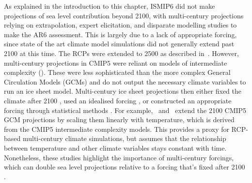 As explained in the introduction to this chapter, ISMIP6 did not make projections of sea level contribution beyond 2100, with multi-century projections relying on extrapolation, expert elicitation, and disparate modelling studies to make the AR6 assessment. This is largely due to a lack of appropriate forcing, since state of the art climate model simulations did not generally extend past 2100 at this time. The RCPs were extended to 2500 as described in~\cite{meinshausenRCPGreenhouseGas2011}. However, multi-century projections in CMIP5 were reliant on models of intermediate complexity (\citealt{zickfeldLongTermClimateChange2013}). These were less sophisticated than the more complex General Circulation Models (GCMs) and do not output the necessary climate variables to run an ice sheet model. Multi-century ice sheet projections then either fixed the climate after 2100 \citep{bindschadlerIcesheetModelSensitivities2013,lowryInfluenceEmissionsScenarios2021,lipscombISMIP6basedProjectionsOceanforced2021,chambersMassLossAntarctic2022}, used an idealised forcing \citep{martinMillennialScaleVulnerabilityAntarctic2019,garbeHysteresisAntarcticIce2020}, or constructed an appropriate forcing through statistical methods \citep{golledgeMultimillennialAntarcticCommitment2015,bulthuisUncertaintyQuantificationMulticentennial2019,decontoParisClimateAgreement2021,greveFutureProjectionsAntarctic2023}. For example,~\cite{golledgeMultimillennialAntarcticCommitment2015} and~\cite{bulthuisUncertaintyQuantificationMulticentennial2019} extend the 2100 CMIP5 GCM projections by scaling them linearly with temperature, which is derived from the CMIP5 intermediate complexity models. This provides a proxy for RCP-based multi-century climate simulations, but assumes that the relationship between temperature and other climate variables stays constant with time. Nonetheless, these studies highlight the importance of multi-century forcings, which can double sea level projections relative to a forcing that's fixed after 2100 \citep{seroussiEvolutionAntarcticIce2024,greveFutureProjectionsAntarctic2023}.

